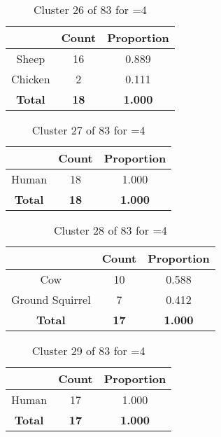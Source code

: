 \begin{table}[ht!]
\centering
\begin{tabular}{|c|c|c|}
\hline
\bf \Spec{} &\bf Count &\bf Proportion\\ \hline \hline
Sheep & 16 & 0.889\\ \hline
Chicken & 2 & 0.111\\ \hline
\hline
\bf Total & \bf 18 & \bf 1.000\\ \hline
\end{tabular}
\label{tab:cluster:26:4}
\caption{Cluster 26 of 83 for \minneigh{}=4}
\end{table}

\begin{table}[ht!]
\centering
\begin{tabular}{|c|c|c|}
\hline
\bf \Spec{} &\bf Count &\bf Proportion\\ \hline \hline
Human & 18 & 1.000\\ \hline
\hline
\bf Total & \bf 18 & \bf 1.000\\ \hline
\end{tabular}
\label{tab:cluster:27:4}
\caption{Cluster 27 of 83 for \minneigh{}=4}
\end{table}

\begin{table}[ht!]
\centering
\begin{tabular}{|c|c|c|}
\hline
\bf \Spec{} &\bf Count &\bf Proportion\\ \hline \hline
Cow & 10 & 0.588\\ \hline
Ground Squirrel & 7 & 0.412\\ \hline
\hline
\bf Total & \bf 17 & \bf 1.000\\ \hline
\end{tabular}
\label{tab:cluster:28:4}
\caption{Cluster 28 of 83 for \minneigh{}=4}
\end{table}

\begin{table}[ht!]
\centering
\begin{tabular}{|c|c|c|}
\hline
\bf \Spec{} &\bf Count &\bf Proportion\\ \hline \hline
Human & 17 & 1.000\\ \hline
\hline
\bf Total & \bf 17 & \bf 1.000\\ \hline
\end{tabular}
\label{tab:cluster:29:4}
\caption{Cluster 29 of 83 for \minneigh{}=4}
\end{table}

